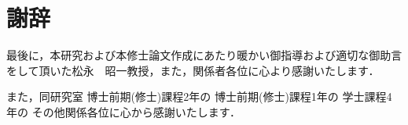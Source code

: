 \chapter*{謝辞}

最後に，本研究および本修士論文作成にあたり暖かい御指導および適切な御助言をして頂いた松永　昭一教授，また，関係者各位に心より感謝いたします．

また，同研究室
博士前期(修士)課程2年の
博士前期(修士)課程1年の
学士課程4年の
その他関係各位に心から感謝いたします．
